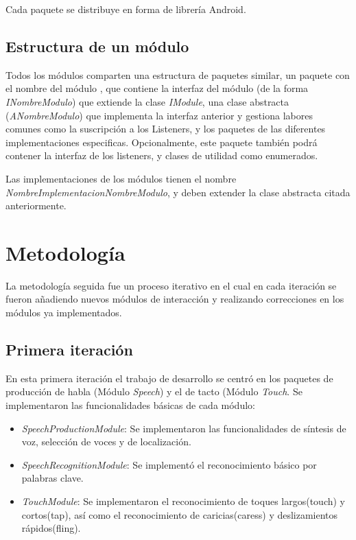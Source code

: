 Cada paquete se distribuye en forma de librería Android.

\subsection{Estructura de un módulo}

Todos los módulos comparten una estructura de paquetes similar, un paquete con el nombre del módulo , que contiene la interfaz del módulo (de la forma \textit{INombreModulo}) que extiende la clase \textit{IModule}, una clase abstracta (\textit{ANombreModulo}) que implementa la interfaz anterior y gestiona labores comunes como la suscripción a los Listeners, y los paquetes de las diferentes implementaciones especificas. Opcionalmente, este paquete también podrá contener la interfaz de los listeners, y clases de utilidad como enumerados.

Las implementaciones de los módulos tienen el nombre \textit{NombreImplementacionNombreModulo}, y deben extender la clase abstracta citada anteriormente.

\section{Metodología}

La metodología seguida fue un proceso iterativo en el cual en cada iteración se fueron añadiendo nuevos módulos de interacción y realizando correcciones en los módulos ya implementados.
\subsection{Primera iteración}

En esta primera iteración el trabajo de desarrollo se centró en los paquetes de producción de habla (Módulo \textit{Speech}) y el de tacto (Módulo \textit{Touch}. Se implementaron las funcionalidades básicas de cada módulo:
\begin{itemize}
	\item \textit{SpeechProductionModule}: Se implementaron las funcionalidades de síntesis de voz, selección de voces y de localización.
	\item \textit{SpeechRecognitionModule}: Se implementó el reconocimiento básico por palabras clave.
	\item \textit{TouchModule}: Se implementaron el reconocimiento de toques largos(touch) y cortos(tap), así como el reconocimiento de caricias(caress) y deslizamientos rápidos(fling).
\end{itemize} 

